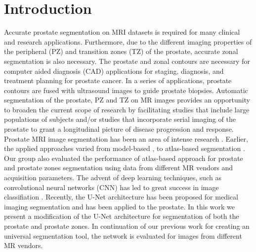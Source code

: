 \section{Introduction}
\label{sec:intro}
Accurate prostate segmentation on MRI datasets is required for many clinical and research 
applications. Furthermore, due to the different imaging properties of the peripheral (PZ) 
and transition zones (TZ) of the prostate, accurate zonal segmentation is also necessary. 
The prostate and zonal contours are necessary for computer aided diagnosis (CAD)
applications for staging, diagnosis, and treatment planning for prostate cancer. In 
a series of applications, prostate contours are fused with ultrasound images to
guide prostate biopsies. Automatic segmentation of the prostate, PZ and TZ on MR 
images provides an opportunity to broaden the current scope of research by facilitating 
studies that include large populations of subjects and/or studies that incorporate 
serial imaging of the prostate to grant a longitudinal picture of disease 
progression and response.  
Prostate MRI image segmentation has been an area of intense research \cite{litjens2014evaluation}. Earlier, the 
applied approaches varied from model-based \cite{chowdhury2012concurrent,toth2012multifeature},
 to atlas-based segmentation
\cite{4_klein2008automatic,5_cheng2014atlas, 6_xie2014low, 7_tian2015fully, 8_korsager2015use, 9_chilali2016gland}.
 Our group also evaluated the performance of atlas-based approach for prostate and prostate zones 
segmentation using data from different MR vendors and acquisition parameters\cite{10_padgett2018towards}. The advent 
of deep learning techniques, such as convolutional neural networks (CNN) has led to great success 
in image classifiation \cite{11_krizhevsky2012imagenet,12_simonyan2011immediate}. Recently, 
the U-Net architecture has been proposed \cite{13_ronneberger2015u} for medical imaging 
segmentation and has been applied to the prostate\cite{14_meyer2018automatic}.
In this work we present a modification of the U-Net architecture for segmentation of both 
the prostate and prostate zones. In continuation of our previous work for creating an 
universal segmentation tool, the network is evaluated for images from different MR vendors.  
